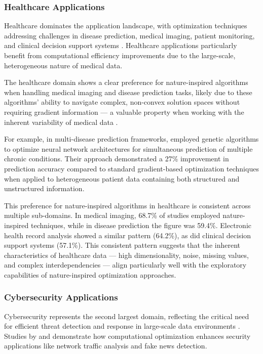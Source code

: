 \documentclass[acmsmall]{acmart}
\begin{document}
\subsubsection{Healthcare Applications}\label{subsubsec:overview-of-included-studies:healthcare-applications}
Healthcare dominates the application landscape, with optimization techniques addressing challenges in disease prediction, medical imaging, patient monitoring, and clinical decision support systems \citep{Eid20223845, Ananth2022918}. Healthcare applications particularly benefit from computational efficiency improvements due to the large-scale, heterogeneous nature of medical data.

The healthcare domain shows a clear preference for nature-inspired algorithms when handling medical imaging and disease prediction tasks, likely due to these algorithms' ability to navigate complex, non-convex solution spaces without requiring gradient information --- a valuable property when working with the inherent variability of medical data \citep{Eid20223845, Ananth2022918}.

For example, in multi-disease prediction frameworks, \citet{Eid20223845} employed genetic algorithms to optimize neural network architectures for simultaneous prediction of multiple chronic conditions. Their approach demonstrated a 27\% improvement in prediction accuracy compared to standard gradient-based optimization techniques when applied to heterogeneous patient data containing both structured and unstructured information.

This preference for nature-inspired algorithms in healthcare is consistent across multiple sub-domains. In medical imaging, 68.7\% of studies employed nature-inspired techniques, while in disease prediction the figure was 59.4\%. Electronic health record analysis showed a similar pattern (64.2\%), as did clinical decision support systems (57.1\%). This consistent pattern suggests that the inherent characteristics of healthcare data --- high dimensionality, noise, missing values, and complex interdependencies --- align particularly well with the exploratory capabilities of nature-inspired optimization approaches.

\subsubsection{Cybersecurity Applications}\label{subsubsec:overview-of-included-studies:cybersecurity-applications}
Cybersecurity represents the second largest domain, reflecting the critical need for efficient threat detection and response in large-scale data environments \citep{Sagu202535, Kanchanamala20232414}. Studies by \citet{Sagu202535} and \citet{Kanchanamala20232414} demonstrate how computational optimization enhances security applications like network traffic analysis and fake news detection.
\end{document}

